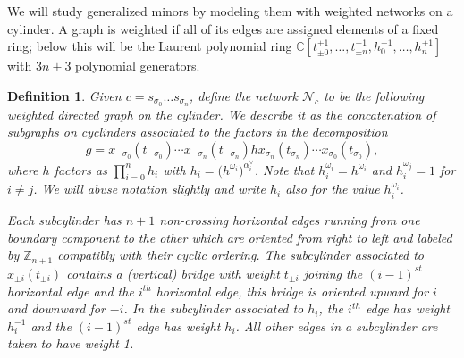 \documentclass[12pt]{amsart}
\newcommand{\CC}{\mathbb{C}}
\newcommand{\ZZ}{\mathbb{Z}}
\newcommand{\cN}{\mathcal{N}} %
\newtheorem{definition}[theorem]{Definition}
\theoremstyle{remark}
\numberwithin{equation}{section}
\begin{document}
We will study generalized minors by modeling them with weighted networks on a cylinder. A graph is weighted if all of its edges are assigned elements of a fixed ring; below this will be the Laurent polynomial ring $\CC[t_{\pm0}^{\pm1},\dotsc,t_{\pm n}^{\pm1},h_0^{\pm1},\dotsc,h_n^{\pm1}]$ with $3n+3$ polynomial generators.

\begin{definition}
Given $c = s_{\sigma_0} \dotsc s_{\sigma_n}$, define the \emph{network} $\cN_c$ to be the following weighted directed graph on the cylinder. We describe it as the concatenation of subgraphs on cyclinders associated to the factors in the decomposition 
\[g=x_{-\sigma_0}(t_{-\sigma_0})\cdots x_{-\sigma_n}(t_{-\sigma_n}) hx_{\sigma_n}(t_{\sigma_n}) \cdots x_{\sigma_0}(t_{\sigma_0}),\]
where $h$ factors as $\prod\limits_{i=0}^n h_i$ with $h_i=\big(h^{\omega_i}\big)^{\alpha_i^\vee}$.  Note that $h_i^{\omega_i}=h^{\omega_i}$ and $h_i^{\omega_j}=1$ for $i\ne j$.  We will abuse notation slightly and write $h_i$ also for the value $h_i^{\omega_i}$.

Each subcylinder has $n+1$ non-crossing \emph{horizontal} edges running from one boundary component to the other which are oriented from right to left and labeled by $\ZZ_{n+1}$ compatibly with their cyclic ordering.  The subcylinder associated to $x_{\pm i}(t_{\pm i})$ contains a (\emph{vertical}) \emph{bridge} with weight $t_{\pm i}$ joining the $(i-1)^{st}$ horizontal edge and the $i^{th}$ horizontal edge, this bridge is oriented upward for $i$ and downward for $-i$.  In the subcylinder associated to $h_i$, the $i^{th}$ edge has weight $h_i^{-1}$ and the $(i-1)^{st}$ edge has weight $h_i$.  All other edges in a subcylinder are taken to have weight 1.
\bigskip


\end{definition}
\end{document}
